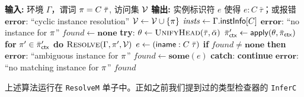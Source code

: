 \begin{algorithm}\caption{Instance Resolution}
  \begin{algorithmic}[1]
    \State \textbf{输入:} 环境 $\Gamma$，谓词 $\pi = C\;\bar{\tau}$, 访问集 $\mathcal{V}$
    \State \textbf{输出:} 实例标识符 $e$ 使得 $e : C\;\bar{\tau}$；或报错
    \State
    \If{$\Pred \in \Visited$} \label{line:cycle}
    \State \Return $\mathbf{error}$:  ``cyclic instance resolution''\EndIf
    $\mathcal{V} \gets \mathcal{V} \cup \{\pi\}$
    \State
    \State $\mathit{insts} \gets \Gamma.\mathsf{instInfo}[C]$ 
    \State \Return $\mathbf{error}$: ``no instance for $\pi$'' \EndIf
    \State $\mathit{found} \gets \mathbf{none}$
     \label{line:search}
    \State \textbf{try}: $\theta \gets \Call{UnifyHead}{\bar{\tau}, \bar{\alpha}}$ \label{line:unify}
    \State {}$\bar{\pi}'_{\mathsf{ctx}} \gets \mathsf{apply}(\theta, \bar{\pi}_{\mathsf{ctx}})$ \label{line:apply-ctx}
    \State {}\textbf{for} $\pi' \in \bar{\pi}'_{\mathsf{ctx}}$ \textbf{do} \label{line:recurse}
    \State {}\quad$\Call{Resolve}{\Gamma, \pi', \Visited}$ 
    \State {}$e \gets (\mathsf{iname} :  C\;\bar{\tau})$  \label{line:evidence}
    \State {}\textbf{if} $\mathit{found} \neq \mathbf{none}$ \textbf{then} \label{line:ambig}
    \State {}\quad\Return $\mathbf{error}$:  ``ambiguous instance for $\pi$''
    \State {}$\mathit{found} \gets \mathbf{some}(e)$
    \State \textbf{catch}: \textbf{continue} 
    \EndFor
    \State \Return $\mathbf{error}$:  ``no matching instance for $\pi$''\EndIf
    \Return $\mathit{found}$
    \EndFunction
  \end{algorithmic}
\end{algorithm}
\endgroup
上述算法运行在 \texttt{ResolveM} 单子中。正如之前我们提到过的类型检查器的 \texttt{InferC}
